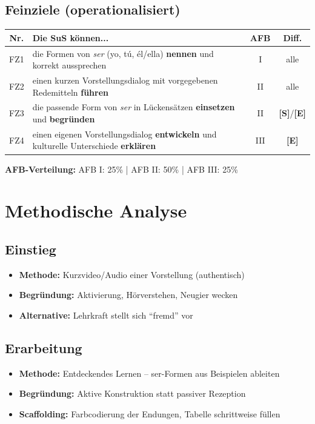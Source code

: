 \documentclass[11pt,a4paper]{article}
\newcommand{\Std}{\textcolor{standard}{\textbf{[S]}}}
\newcommand{\E}{\textcolor{erweiterung}{\textbf{[E]}}}
\begin{document}
\subsection{Feinziele (operationalisiert)}
\begin{tabular}{|c|p{7.5cm}|c|c|}
\hline
\textbf{Nr.} & \textbf{Die SuS können...} & \textbf{AFB} & \textbf{Diff.} \\
\hline
FZ1 & die Formen von \textit{ser} (yo, tú, él/ella) \textbf{nennen} und korrekt aussprechen & I & alle \\
\hline
FZ2 & einen kurzen Vorstellungsdialog mit vorgegebenen Redemitteln \textbf{führen} & II & alle \\
\hline
FZ3 & die passende Form von \textit{ser} in Lückensätzen \textbf{einsetzen} und \textbf{begründen} & II & \Std{}/\E{} \\
\hline
FZ4 & einen eigenen Vorstellungsdialog \textbf{entwickeln} und kulturelle Unterschiede \textbf{erklären} & III & \E{} \\
\hline
\end{tabular}

\vspace{1em}
\textbf{AFB-Verteilung:} AFB I: 25\% | AFB II: 50\% | AFB III: 25\%

\section{Methodische Analyse}

\subsection{Einstieg}
\begin{itemize}
    \item \textbf{Methode:} Kurzvideo/Audio einer Vorstellung (authentisch)
    \item \textbf{Begründung:} Aktivierung, Hörverstehen, Neugier wecken
    \item \textbf{Alternative:} Lehrkraft stellt sich ``fremd'' vor
\end{itemize}

\subsection{Erarbeitung}
\begin{itemize}
    \item \textbf{Methode:} Entdeckendes Lernen -- ser-Formen aus Beispielen ableiten
    \item \textbf{Begründung:} Aktive Konstruktion statt passiver Rezeption
    \item \textbf{Scaffolding:} Farbcodierung der Endungen, Tabelle schrittweise füllen
\end{itemize}
\end{document}
